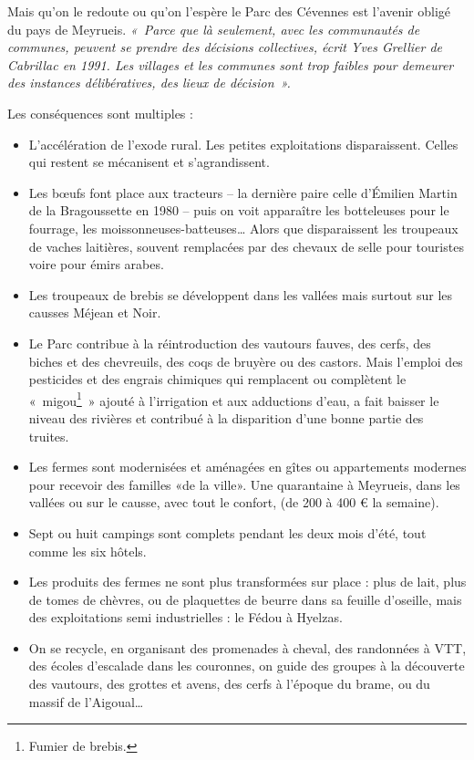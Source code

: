 Mais qu’on le redoute ou qu’on l’espère le Parc des Cévennes est l’avenir obligé du pays de
Meyrueis. \emph{«~Parce que là seulement, avec les communautés de communes, peuvent se prendre des décisions
collectives, écrit Yves Grellier de Cabrillac en 1991. Les villages et les communes sont trop faibles pour
demeurer des instances délibératives, des lieux de décision~».}

Les conséquences sont multiples :

\begin{itemize}
    \item L’accélération de l’exode rural. Les petites exploitations disparaissent. Celles qui
    restent se mécanisent et s’agrandissent.

    \item Les bœufs font place aux tracteurs -- la dernière paire celle d’Émilien Martin de la
    Bragoussette en 1980 -- puis on voit apparaître les botteleuses pour le fourrage, les
    moissonneuses-batteuses… Alors que disparaissent les troupeaux de vaches laitières,
    souvent remplacées par des chevaux de selle pour touristes voire pour émirs arabes.

    \item Les troupeaux de brebis se développent dans les vallées mais surtout sur les causses
    Méjean et Noir.

    \item Le Parc contribue à la réintroduction des vautours fauves, des cerfs, des biches et des
    chevreuils, des coqs de bruyère ou des castors. Mais l’emploi des pesticides et des
    engrais chimiques qui remplacent ou complètent le «~migou\footnote{Fumier de brebis.}~»
    ajouté à l’irrigation et aux adductions d’eau, a fait baisser le niveau des rivières et
    contribué à la disparition d’une bonne partie des truites.

    \item Les fermes sont modernisées et aménagées en gîtes ou appartements modernes pour
    recevoir des familles «de la ville». Une quarantaine à Meyrueis, dans les vallées ou sur
    le causse, avec tout le confort, (de 200 à 400 € la semaine).

    \item Sept ou huit campings sont complets pendant les deux mois d’été, tout comme les six
    hôtels.

    \item Les produits des fermes ne sont plus transformées sur place : plus de lait, plus de
    tomes de chèvres, ou de plaquettes de beurre dans sa feuille d’oseille, mais des
    exploitations semi industrielles : le Fédou à Hyelzas.

    \item On se recycle, en organisant des promenades à cheval, des randonnées à VTT, des
    écoles d’escalade dans les couronnes, on guide des groupes à la découverte des
    vautours, des grottes et avens, des cerfs à l’époque du brame, ou du massif de
    l’Aigoual…
\end{itemize}

